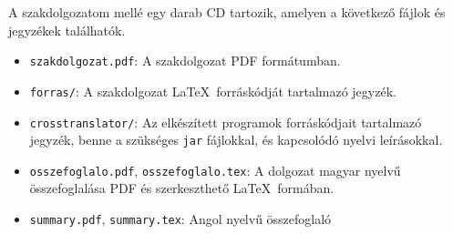 
A szakdolgozatom mellé egy darab CD tartozik, amelyen a következő fájlok és jegyzékek találhatók.

\begin{itemize}
\item \texttt{szakdolgozat.pdf}: A szakdolgozat PDF formátumban.
\item \texttt{forras/}: A szakdolgozat \LaTeX\ forráskódját tartalmazó jegyzék. 
\item \texttt{crosstranslator/}: Az elkészített programok forráskódjait tartalmazó jegyzék, benne a szükséges \texttt{jar} fájlokkal, és kapcsolódó nyelvi leírásokkal.
\item \texttt{osszefoglalo.pdf}, \texttt{osszefoglalo.tex}: A dolgozat magyar nyelvű összefoglalása PDF és szerkeszthető \LaTeX\ formában.
\item \texttt{summary.pdf}, \texttt{summary.tex}: Angol nyelvű összefoglaló
\end{itemize}
